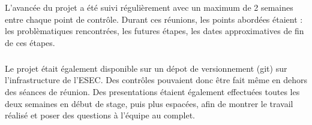 L'avancée du projet a été suivi régulièrement avec un maximum de 2 semaines entre chaque point de contrôle. Durant ces réunions,
les points abordées étaient : les problèmatiques rencontrées, les futures étapes, les dates approximatives de fin de ces étapes.
\subparagraph{}
Le projet était également disponible sur un dépot de versionnement (git) sur l'infrastructure de l'ESEC. Des contrôles pouvaient donc être
fait même en dehors des séances de réunion. Des presentations étaient également effectuées toutes les deux semaines en début de stage, puis plus
espacées, afin de montrer le travail réalisé et poser des questions à l'équipe au complet.
